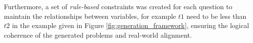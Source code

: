 {\begin{enumerate}[topsep=5pt, leftmargin=1em]


    Furthermore, a set of \textit{rule-based} constraints was created for each question to maintain the relationships between variables, for example $t1$ need to be less than $t2$ in the example given in Figure \ref{fig:generation_framework}, ensuring the logical coherence of the generated problems and real-world alignment.









\end{enumerate}}
